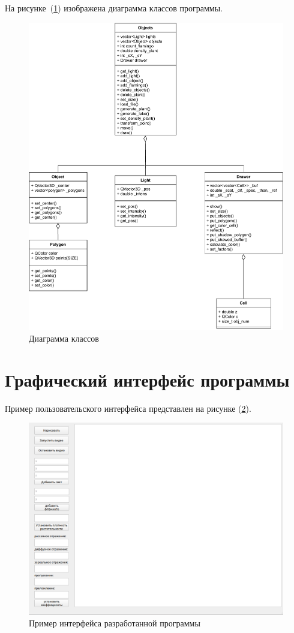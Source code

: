 На рисунке~(\ref{fig:struct}) изображена диаграмма классов программы.
\clearpage
\begin{figure}[h!]
	\centering
	\includegraphics[width=0.9\linewidth]{img/struct}
	\caption{Диаграмма классов}
	\label{fig:struct}
\end{figure}

\section{Графический интерфейс программы}

Пример пользовательского интерфейса представлен на рисунке (\ref{fig:inter}).

\begin{figure}[h!]
	\centering
	\includegraphics[width=0.8\linewidth]{img/inter}
	\caption{Пример интерфейса разработанной программы}
	\label{fig:inter}
\end{figure}

